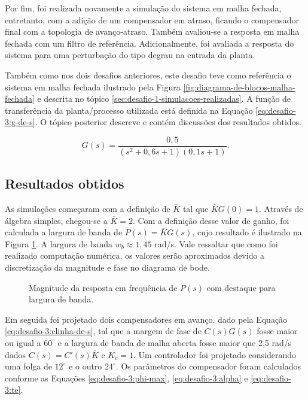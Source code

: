 Por fim, foi realizada novamente a simulação do sistema em malha fechada,
entretanto, com a adição de um compensador em atraso, ficando o compensador
final com a topologia de avanço-atraso. Também avaliou-se a resposta em malha
fechada com um filtro de referência. Adicionalmente, foi avaliada a resposta do
sistema para uma perturbação do tipo degrau na entrada da planta.

Também como nos dois desafios anteriores, este desafio teve como referência o
sistema em malha fechada ilustrado pela Figura
\ref{fig:diagrama-de-blocos-malha-fechada} e descrita no tópico
\ref{sec:desafio-1-simulacoes-realizadas}. A função de transferência da
planta/processo utilizada está definida na Equação \ref{eq:desafio-3:g-de-s}. O
tópico posterior descreve e contém discussões dos resultados obtidos.

\begin{equation}
    \label{eq:desafio-3:g-de-s}
    G(s) = \frac{0,5}{(s^2 + 0,6s +1)(0,1s + 1)}.
\end{equation}

\subsection{Resultados obtidos}
As simulações começaram com a definição de $\overline{K}$ tal que
$\overline{K}G(0) = 1$. Através de álgebra simples, chegou-se a $\overline{K} = 2$.
Com a definição desse valor de ganho, foi calculada a largura de banda de $P(s)
= \overline{K}G(s)$, cujo resultado é ilustrado na Figura
\ref{fig:desafio-3:questao-3}. A largura de banda $w_{b} \approx 1,45$ rad/s.
Vale ressaltar que como foi realizado computação numérica, os valores
serão aproximados devido a discretização da magnitude e fase no diagrama de bode.

\begin{figure}[!ht]
    \caption{Magnitude da resposta em frequência de $P(s)$
    com destaque para largura de banda.}
    \vspace{-10pt}
    \hspace{-30pt}
    \label{fig:desafio-3:questao-3}
    \begin{minipage}{\linewidth}
        
    \end{minipage}
\end{figure}

Em seguida foi projetado dois compensadores em avanço, dado pela Equação
\ref{eq:desafio-3:clinha-de-s}, tal que a margem de fase de $C(s)G(s)$ fosse
maior ou igual a $60^{\circ}$ e a largura de banda de malha aberta fosse maior
que 2,5 rad/s dados $C(s) = {C}'(s)\overline{K}$ e $K_{c} = 1$. Um controlador
foi projetado considerando uma folga de $12^{\circ}$ e o outro $24^{\circ}$. Os
parâmetros do compensador foram calculados conforme as Equações
\ref{eq:desafio-3:phi-max}, \ref{eq:desafio-3:alpha} e \ref{eq:desafio-3:te}.

